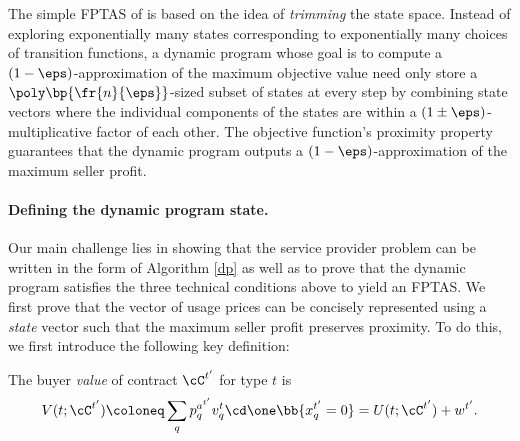         
	
            

	

The simple FPTAS of \citet{woeginger2000} is based on the idea of \emph{trimming} the state space. Instead of exploring exponentially many states corresponding to exponentially many choices of transition functions, a dynamic program whose goal is to compute a $(1-\eps)$-approximation of the maximum objective value need only store a $\poly\bp{\fr{n}{\eps}}$-sized subset of states at every step by combining state vectors where the individual components of the states are within a $(1\pm \eps)$-multiplicative factor of each other. The objective function's proximity property guarantees that the dynamic program outputs a $(1-\eps)$-approximation of the maximum seller profit.

\paragraph{Defining the dynamic program state.} 

Our main challenge lies in showing that the service provider problem can be written in the form of Algorithm \ref{dp} as well as to prove that the dynamic program satisfies the three technical conditions above to yield an FPTAS. We first prove that the vector of usage prices can be concisely represented using a \emph{state} vector such that the maximum seller profit preserves proximity. To do this, we first introduce the following key definition:

\begin{definition*}
    The buyer \emph{value} of contract $\cC^{t'}$ for type $t$ is $$V(t;\cC^{t'}) \coloneq \sum_{q} p^{a^{t'}}_q v^t_q \cd \one\bb{x^{t'}_q = 0} = U(t;\cC^{t'}) + w^{t'}.$$
\end{definition*}

